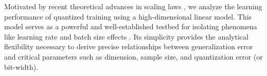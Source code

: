 \documentclass[11pt, letterpaper]{article}
\begin{document}
Motivated by recent theoretical advances in scaling laws \citep{lin2024scaling,lin2025improved,li2025functional}, we analyze the learning performance of quantized training using a high-dimensional linear model. This model serves as a powerful and well-established testbed for isolating phenomena like learning rate and batch size effects \citep{kunstner2025scaling,luo2025multi,zhang2024does,xiao2024rethinking, ren2025emergence,bordelon2025feature}. Its simplicity provides the analytical flexibility necessary to derive precise relationships between generalization error and critical parameters such as dimension, sample size, and quantization error (or bit-width).

\end{document}
